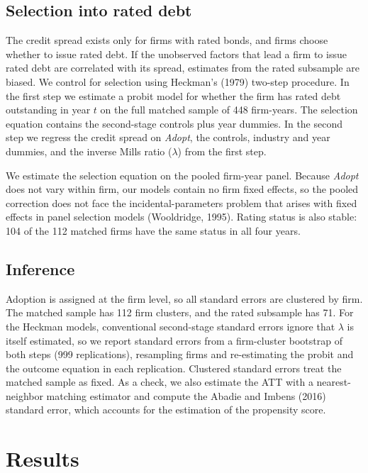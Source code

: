 \documentclass[11pt]{article}
\begin{document}
\subsection{Selection into rated debt}

The credit spread exists only for firms with rated bonds, and firms choose whether to issue rated debt. If the unobserved factors that lead a firm to issue rated debt are correlated with its spread, estimates from the rated subsample are biased. We control for selection using Heckman's (1979) two-step procedure. In the first step we estimate a probit model for whether the firm has rated debt outstanding in year $t$ on the full matched sample of 448 firm-years. The selection equation contains the second-stage controls plus year dummies. In the second step we regress the credit spread on \textit{Adopt}, the controls, industry and year dummies, and the inverse Mills ratio ($\lambda$) from the first step.

We estimate the selection equation on the pooled firm-year panel. Because \textit{Adopt} does not vary within firm, our models contain no firm fixed effects, so the pooled correction does not face the incidental-parameters problem that arises with fixed effects in panel selection models (Wooldridge, 1995). Rating status is also stable: 104 of the 112 matched firms have the same status in all four years.

\subsection{Inference}

Adoption is assigned at the firm level, so all standard errors are clustered by firm. The matched sample has 112 firm clusters, and the rated subsample has 71. For the Heckman models, conventional second-stage standard errors ignore that $\lambda$ is itself estimated, so we report standard errors from a firm-cluster bootstrap of both steps (999 replications), resampling firms and re-estimating the probit and the outcome equation in each replication. Clustered standard errors treat the matched sample as fixed. As a check, we also estimate the ATT with a nearest-neighbor matching estimator and compute the Abadie and Imbens (2016) standard error, which accounts for the estimation of the propensity score.

\section{Results}
\end{document}
